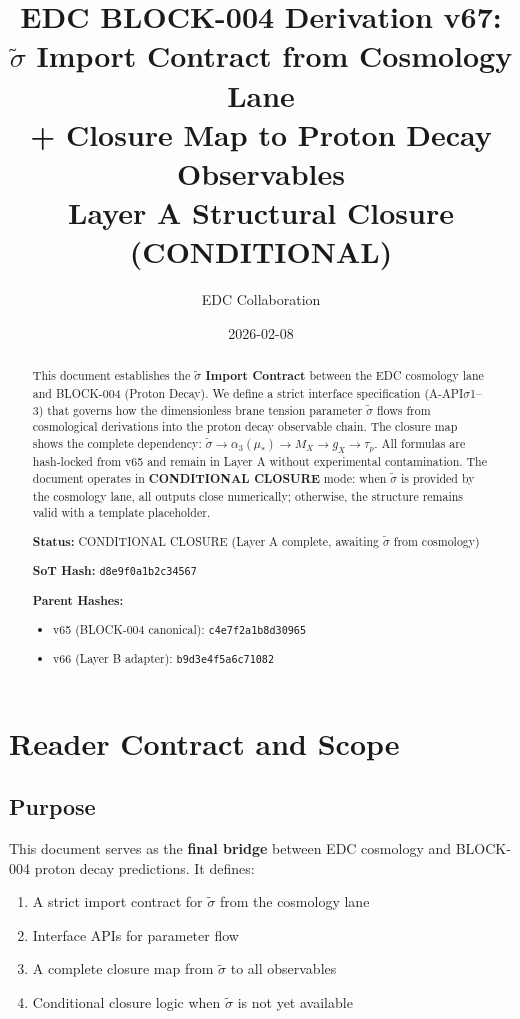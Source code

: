 \documentclass[11pt,letterpaper]{article}
\title{%
EDC BLOCK-004 Derivation v67:\\[0.3em]
\Large $\tilde{\sigma}$ Import Contract from Cosmology Lane\\[0.2em]
+ Closure Map to Proton Decay Observables\\[0.5em]
\normalsize Layer A Structural Closure (CONDITIONAL)
}
\author{EDC Collaboration}
\date{2026-02-08}
\newcommand{\st}{\tilde{\sigma}}
\begin{document}
\maketitle

\begin{abstract}
This document establishes the \textbf{$\tilde{\sigma}$ Import Contract} between the EDC cosmology lane and BLOCK-004 (Proton Decay). We define a strict interface specification (A-API$\sigma$1--3) that governs how the dimensionless brane tension parameter $\st$ flows from cosmological derivations into the proton decay observable chain. The closure map shows the complete dependency: $\st \to \alpha_3(\mu_*) \to M_X \to g_X \to \tau_p$. All formulas are hash-locked from v65 and remain in Layer A without experimental contamination. The document operates in \textbf{CONDITIONAL CLOSURE} mode: when $\st$ is provided by the cosmology lane, all outputs close numerically; otherwise, the structure remains valid with a template placeholder.

\textbf{Status:} CONDITIONAL CLOSURE (Layer A complete, awaiting $\st$ from cosmology)

\textbf{SoT Hash:} \texttt{d8e9f0a1b2c34567}

\textbf{Parent Hashes:}
\begin{itemize}[noitemsep]
\item v65 (BLOCK-004 canonical): \texttt{c4e7f2a1b8d30965}
\item v66 (Layer B adapter): \texttt{b9d3e4f5a6c71082}
\end{itemize}
\end{abstract}

\tableofcontents
\newpage

\section{Reader Contract and Scope}
\label{sec:reader-contract}

\subsection{Purpose}
\label{subsec:purpose}

This document serves as the \textbf{final bridge} between EDC cosmology and BLOCK-004 proton decay predictions. It defines:

\begin{enumerate}[label=(\roman*)]
\item A strict import contract for $\st$ from the cosmology lane
\item Interface APIs for parameter flow
\item A complete closure map from $\st$ to all observables
\item Conditional closure logic when $\st$ is not yet available
\end{enumerate}
\end{document}
